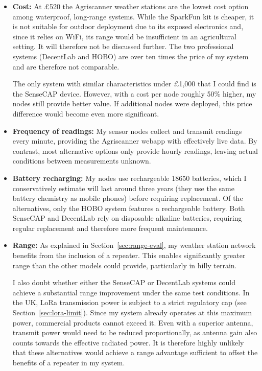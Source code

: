 \begin{itemize}
  \item \textbf{Cost:} At £520 the Agriscanner weather stations are the lowest
        cost option among waterproof, long-range systems. While the SparkFun kit
        is cheaper, it is not suitable for outdoor deployment due to its exposed
        electronics and, since it relies on WiFi, its range would be
        insufficient in an agricultural setting. It will therefore not be
        discussed further. The two professional systems (DecentLab and HOBO) are
        over ten times the price of my system and are therefore not comparable.

        The only system with similar characteristics under £1,000 that I could
        find is the SenseCAP device. However, with a cost per node roughly 50\%
        higher, my nodes still provide better value. If additional nodes were
        deployed, this price difference would become even more significant.

  \item \textbf{Frequency of readings:} My sensor nodes collect and transmit
        readings every minute, providing the Agriscanner webapp with effectively
        live data. By contrast, most alternative options only provide hourly
        readings, leaving actual conditions between measurements unknown.

  \item \textbf{Battery recharging:} My nodes use rechargeable 18650 batteries,
        which I conservatively estimate will last around three years (they use
        the same battery chemistry as mobile phones) before requiring
        replacement. Of the alternatives, only the HOBO system features a
        rechargeable battery. Both SenseCAP and DecentLab rely on disposable
        alkaline batteries, requiring regular replacement and therefore more
        frequent maintenance.

  \item \textbf{Range:} As explained in Section~\ref{sec:range-eval}, my weather
        station network benefits from the inclusion of a repeater. This enables
        significantly greater range than the other models could provide,
        particularly in hilly terrain.

        I also doubt whether either the SenseCAP or DecentLab systems could
        achieve a substantial range improvement under the same test conditions.
        In the UK, LoRa transmission power is subject to a strict regulatory cap
        (see Section~\ref{sec:lora-limit}). Since my system already operates at
        this maximum power, commercial products cannot exceed it. Even with a
        superior antenna, transmit power would need to be reduced
        proportionally, as antenna gain also counts towards the effective
        radiated power. It is therefore highly unlikely that these alternatives
        would achieve a range advantage sufficient to offset the benefits of a
        repeater in my system.
\end{itemize}

